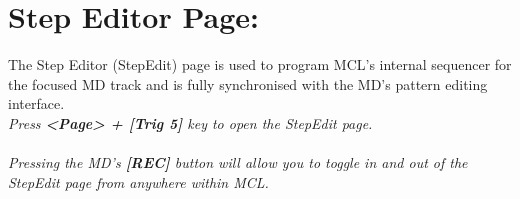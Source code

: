 \chapter{Step Editor Page:}
The Step Editor (StepEdit) page is used to program MCL's internal sequencer for the focused MD track and is fully synchronised with the MD's pattern editing interface.
\\
\textit{Press \textbf{<Page> + [Trig 5]} key to open the StepEdit page.}\\\\
\textit{Pressing the MD's \textbf{[REC]} button will allow you to toggle in and out of the StepEdit page from anywhere within MCL.}

\newpage
